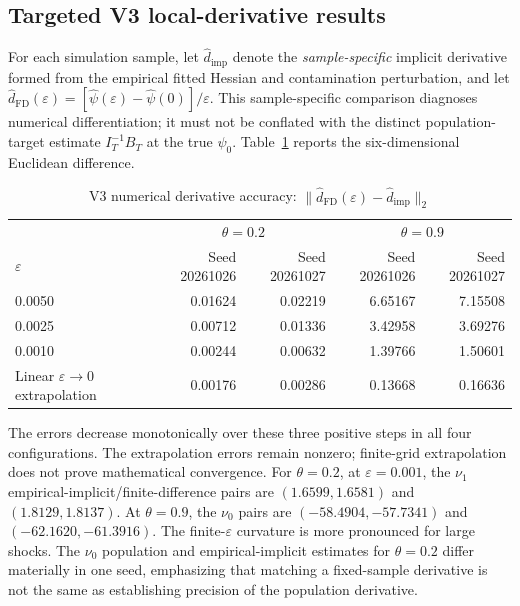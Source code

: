 \documentclass[11pt,a4paper]{article}
\newcommand{\eps}{\varepsilon}
\begin{document}
\subsection{Targeted V3 local-derivative results}
For each simulation sample, let $\widehat d_{\mathrm{imp}}$ denote the \emph{sample-specific} implicit derivative formed from the empirical fitted Hessian and contamination perturbation, and let $\widehat d_{\mathrm{FD}}(\eps)=[\widehat\psi(\eps)-\widehat\psi(0)]/\eps$. This sample-specific comparison diagnoses numerical differentiation; it must not be conflated with the distinct population-target estimate $I_T^{-1}B_T$ at the true $\psi_0$. Table~\ref{tab:v3} reports the six-dimensional Euclidean difference.
\begin{table}[htbp]\centering\small\setlength{\tabcolsep}{4pt}\caption{V3 numerical derivative accuracy: $\|\widehat d_{\mathrm{FD}}(\eps)-\widehat d_{\mathrm{imp}}\|_2$}\label{tab:v3}
\begin{tabular}{lrrrr}\toprule
& \multicolumn{2}{c}{$\theta=0.2$} & \multicolumn{2}{c}{$\theta=0.9$}\\
$\eps$ & Seed 20261026 & Seed 20261027 & Seed 20261026 & Seed 20261027\\\midrule
0.0050 & 0.01624 & 0.02219 & 6.65167 & 7.15508\\
0.0025 & 0.00712 & 0.01336 & 3.42958 & 3.69276\\
0.0010 & 0.00244 & 0.00632 & 1.39766 & 1.50601\\\midrule
Linear $\eps\to0$ extrapolation & 0.00176 & 0.00286 & 0.13668 & 0.16636\\\bottomrule
\end{tabular}
\end{table}
The errors decrease monotonically over these three positive steps in all four configurations. The extrapolation errors remain nonzero; finite-grid extrapolation does not prove mathematical convergence. For $\theta=0.2$, at $\eps=0.001$, the $\nu_1$ empirical-implicit/finite-difference pairs are $(1.6599,1.6581)$ and $(1.8129,1.8137)$. At $\theta=0.9$, the $\nu_0$ pairs are $(-58.4904,-57.7341)$ and $(-62.1620,-61.3916)$. The finite-$\eps$ curvature is more pronounced for large shocks. The $\nu_0$ population and empirical-implicit estimates for $\theta=0.2$ differ materially in one seed, emphasizing that matching a fixed-sample derivative is not the same as establishing precision of the population derivative.
\end{document}
